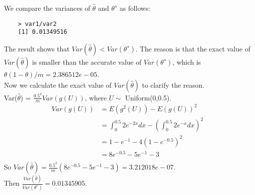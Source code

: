 \documentclass[UTF8]{ctexart}
\begin{document}
We compare the variances of $\hat{\theta}$ and $\theta^∗$ as follows:
\begin{lstlisting}
    > var1/var2
    [1] 0.01349516
\end{lstlisting}
The result shows that $Var(\hat{\theta})<Var(\theta^∗)$. 
The reason is that the exact value of $Var(\hat{\theta})$ is smaller than the accurate value of $Var(\theta^∗)$, which is $\theta(1-\theta)/m = 2.386512e-05$.\\
Now we calculate the exact value of $Var(\hat{\theta})$ to clarify the reason.\\
Var($\hat{\theta}$) = $\frac{0.5^2}{m}Var(g(U))$, where $U \sim$ Uniform(0,0.5).\\
\begin{equation*}
    \begin{split}
        Var(g(U)) &= E(g^2(U)) - E(g(U))^2\\
        &= \int_{0}^{0.5} 2e^{-2x} dx - (\int_{0}^{0.5} 2e^{-x} dx)^2\\
        &= 1 - e^{-1} - 4(1 - e^{-0.5})^2\\
        &= 8e^{-0.5} - 5e^{-1} -3\\
    \end{split}
\end{equation*}
So $Var(\hat{\theta}) = \frac{0.5^2}{m}(8e^{-0.5} - 5e^{-1} -3) = 3.212018e − 07$.\\
Then $\frac{Var(\hat{\theta})}{Var(\theta^∗)} = 0.01345905$.\\
\end{document}
